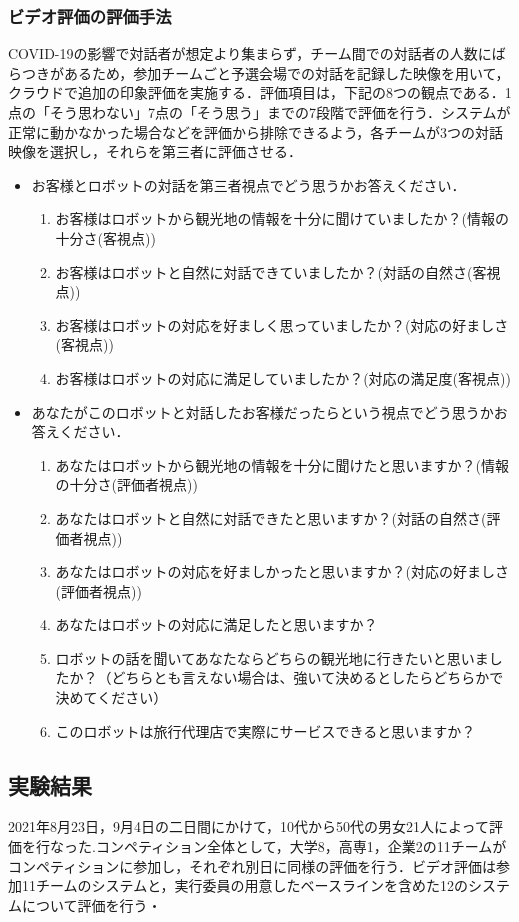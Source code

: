 \subsubsection{ビデオ評価の評価手法}
COVID-19の影響で対話者が想定より集まらず，チーム間での対話者の人数にばらつきがあるため，参加チームごと予選会場での対話を記録した映像を用いて，クラウドで追加の印象評価を実施する．評価項目は，下記の8つの観点である．1点の「そう思わない」7点の「そう思う」までの7段階で評価を行う．システムが正常に動かなかった場合などを評価から排除できるよう，各チームが3つの対話映像を選択し，それらを第三者に評価させる．
\begin{itemize}
    \item お客様とロボットの対話を第三者視点でどう思うかお答えください．
    \begin{enumerate}
        \item お客様はロボットから観光地の情報を十分に聞けていましたか？(情報の十分さ(客視点))
        \item お客様はロボットと自然に対話できていましたか？(対話の自然さ(客視点))
        \item お客様はロボットの対応を好ましく思っていましたか？(対応の好ましさ(客視点))
        \item お客様はロボットの対応に満足していましたか？(対応の満足度(客視点))
    \end{enumerate}
    \item あなたがこのロボットと対話したお客様だったらという視点でどう思うかお答えください．
    \begin{enumerate}
        \item あなたはロボットから観光地の情報を十分に聞けたと思いますか？(情報の十分さ(評価者視点))
        \item あなたはロボットと自然に対話できたと思いますか？(対話の自然さ(評価者視点))
        \item あなたはロボットの対応を好ましかったと思いますか？(対応の好ましさ(評価者視点))
        \item あなたはロボットの対応に満足したと思いますか？
        \item ロボットの話を聞いてあなたならどちらの観光地に行きたいと思いましたか？（どちらとも言えない場合は、強いて決めるとしたらどちらかで決めてください）
        \item このロボットは旅行代理店で実際にサービスできると思いますか？
    \end{enumerate}
\end{itemize}

\subsection{実験結果}
2021年8月23日，9月4日の二日間にかけて，10代から50代の男女21人によって評価を行なった.コンペティション全体として，大学8，高専1，企業2の11チームがコンペティションに参加し，それぞれ別日に同様の評価を行う．ビデオ評価は参加11チームのシステムと，実行委員の用意したベースラインを含めた12のシステムについて評価を行う・

